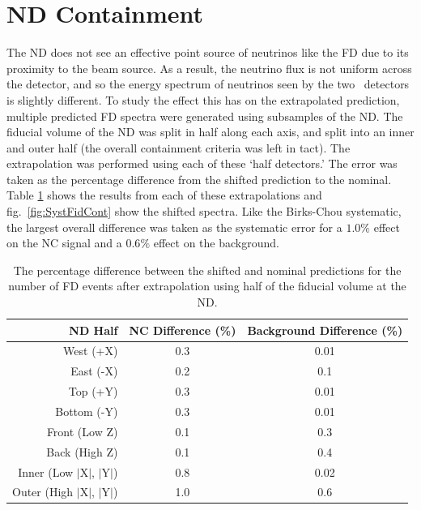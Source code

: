 \section{ND Containment}

The ND does not see an effective point source of neutrinos like the FD due to its proximity to the beam source. As a result, the neutrino flux is not uniform across the detector, and so the energy spectrum of neutrinos seen by the two \nova~detectors is slightly different. To study the effect this has on the extrapolated prediction, multiple predicted FD spectra were generated using subsamples of the ND. The fiducial volume of the ND was split in half along each axis, and split into an inner and outer half (the overall containment criteria was left in tact). The extrapolation was performed using each of these `half detectors.' The error was taken as the percentage difference from the shifted prediction to the nominal. Table \ref{tab:SystFidCont} shows the results from each of these extrapolations and fig.~\ref{fig:SystFidCont} show the shifted spectra. Like the Birks-Chou systematic, the largest overall difference was taken as the systematic error for a $1.0\%$ effect on the NC signal and a $0.6\%$ effect on the background.
\begin{table}[h]
  \begin{center}
    \caption[ND Containment Systematic Errors]{The percentage difference between the shifted and nominal predictions for the number of FD events after extrapolation using half of the fiducial volume at the ND.}
    \label{tab:SystFidCont}
    \begin{tabular}{r c c}
      \hline\hline
      ND Half & NC Difference (\%) & Background Difference (\%) \\
      \hline
      West (+X) & 0.3 & 0.01 \\
      East (-X) & 0.2 & 0.1 \\
      Top (+Y) & 0.3 & 0.01 \\
      Bottom (-Y) & 0.3 & 0.01 \\
      Front (Low Z) & 0.1 & 0.3 \\
      Back (High Z) & 0.1 & 0.4 \\
      Inner (Low $\vert$X$\vert$, $\vert$Y$\vert$) & 0.8 & 0.02 \\
      Outer (High $\vert$X$\vert$, $\vert$Y$\vert$) & 1.0 & 0.6 \\
      \hline
    \end{tabular}
  \end{center}
\end{table}

